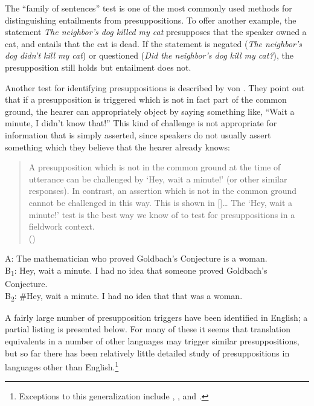 The “family of sentences” test is one of the most commonly used methods for distinguishing entailments from presuppositions. To offer another example, the statement \textit{The neighbor’s dog killed my cat} presupposes that the speaker owned a cat, and entails that the cat is dead. If the statement is negated (\textit{The neighbor’s dog didn’t kill my cat}) or questioned (\textit{Did the neighbor’s dog kill my cat?}), the presupposition still holds but entailment does not.



Another test for identifying presuppositions is described by von \citet{FintelMatthewson2008}. They point out that if a presupposition is triggered which is not in fact part of the common ground, the hearer can appropriately object by saying something like, “Wait a minute, I didn’t know that!” This kind of challenge is not appropriate for information that is simply asserted, since speakers do not usually assert something which they believe that the hearer already knows:


\begin{quote}
A presupposition which is not in the common ground at the time of utterance can be challenged by ‘Hey, wait a minute!’ (or other similar responses). In contrast, an assertion which is not in the common ground cannot be challenged in this way. This is shown in []… The ‘Hey, wait a minute!’ test is the best way we know of to test for presuppositions in a fieldwork context.\\
   (\citealt{vonFintelMatthewson2008})
\end{quote}

\ea \label{ex:3.13}
A: The mathematician who proved Goldbach’s Conjecture is a woman.\\
B\textsubscript{1}: Hey, wait a minute. I had no idea that someone proved Goldbach’s Conjecture.\\
B\textsubscript{2}: \#Hey, wait a minute. I had no idea that that was a woman.
\z


A fairly large number of presupposition triggers have been identified in English; a partial listing is presented below. For many of these it seems that translation equivalents in a number of other languages may trigger similar presuppositions, but so far there has been relatively little detailed study of presuppositions in languages other than English.\footnote{Exceptions to this generalization include \citet{LevinsonAnnamalai1992}, \citet{Matthewson2006}, and \citet{TonhauserEtAl2013}.}


